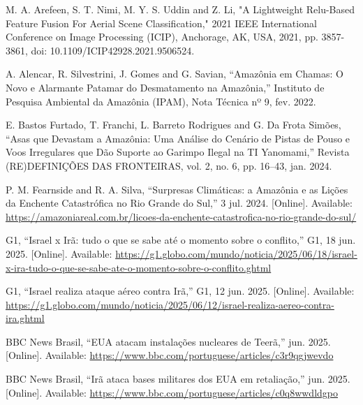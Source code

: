 \documentclass[conference]{IEEEtran}
\begin{document}
\begin{thebibliography}{00}
     M. A. Arefeen, S. T. Nimi, M. Y. S. Uddin and Z. Li, "A Lightweight Relu-Based Feature Fusion For Aerial Scene Classification," 2021 IEEE International Conference on Image Processing (ICIP), Anchorage, AK, USA, 2021, pp. 3857-3861, doi: 10.1109/ICIP42928.2021.9506524.

    A. Alencar, R. Silvestrini, J. Gomes and G. Savian,  
    “Amazônia em Chamas: O Novo e Alarmante Patamar do Desmatamento na Amazônia,”  
    Instituto de Pesquisa Ambiental da Amazônia (IPAM), Nota Técnica nº 9, fev. 2022.

    E. Bastos Furtado, T. Franchi, L. Barreto Rodrigues and G. Da Frota Simões,  
    “Asas que Devastam a Amazônia: Uma Análise do Cenário de Pistas de Pouso e Voos Irregulares que Dão Suporte ao Garimpo Ilegal na TI Yanomami,”  
    Revista (RE)DEFINIÇÕES DAS FRONTEIRAS, vol. 2, no. 6, pp. 16–43, jan. 2024.

    P. M. Fearnside and R. A. Silva,  
    “Surpresas Climáticas: a Amazônia e as Lições da Enchente Catastrófica no Rio Grande do Sul,”  
    3 jul. 2024. [Online]. Available: \url{https://amazoniareal.com.br/licoes-da-enchente-catastrofica-no-rio-grande-do-sul/}

    G1,  
    “Israel x Irã: tudo o que se sabe até o momento sobre o conflito,”  
    G1, 18 jun. 2025. [Online]. Available: \url{https://g1.globo.com/mundo/noticia/2025/06/18/israel-x-ira-tudo-o-que-se-sabe-ate-o-momento-sobre-o-conflito.ghtml}

    G1,  
    “Israel realiza ataque aéreo contra Irã,”  
    G1, 12 jun. 2025. [Online]. Available: \url{https://g1.globo.com/mundo/noticia/2025/06/12/israel-realiza-aereo-contra-ira.ghtml}

    BBC News Brasil,  
    “EUA atacam instalações nucleares de Teerã,”  
    jun. 2025. [Online]. Available: \url{https://www.bbc.com/portuguese/articles/c3r9qgjwevdo}

    BBC News Brasil,  
    “Irã ataca bases militares dos EUA em retaliação,”  
    jun. 2025. [Online]. Available: \url{https://www.bbc.com/portuguese/articles/c0q8wwdldgpo}
    

\end{thebibliography}



\end{document}
